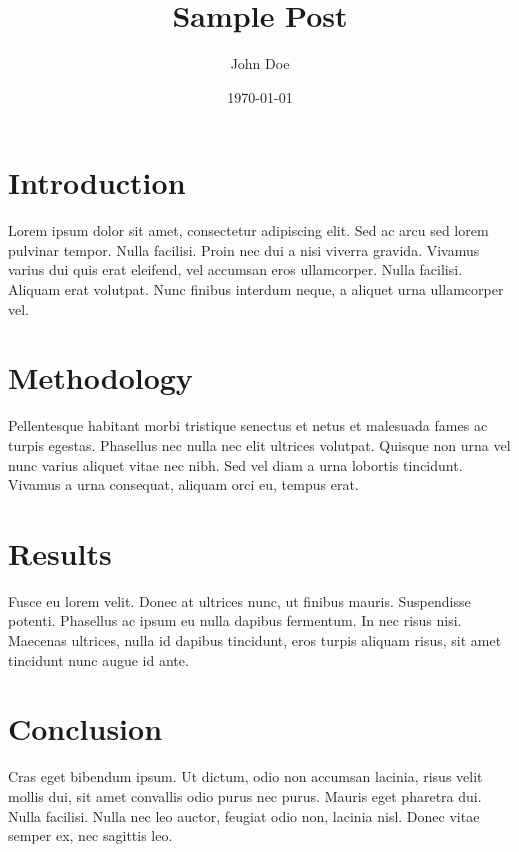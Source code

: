 \documentclass{article}
\title{Sample Post}
\author{John Doe}
\date{\today}
\begin{document}
\maketitle

\section{Introduction}
Lorem ipsum dolor sit amet, consectetur adipiscing elit. Sed ac arcu sed lorem pulvinar tempor. Nulla facilisi. Proin nec dui a nisi viverra gravida. Vivamus varius dui quis erat eleifend, vel accumsan eros ullamcorper. Nulla facilisi. Aliquam erat volutpat. Nunc finibus interdum neque, a aliquet urna ullamcorper vel.

\section{Methodology}
Pellentesque habitant morbi tristique senectus et netus et malesuada fames ac turpis egestas. Phasellus nec nulla nec elit ultrices volutpat. Quisque non urna vel nunc varius aliquet vitae nec nibh. Sed vel diam a urna lobortis tincidunt. Vivamus a urna consequat, aliquam orci eu, tempus erat.

\section{Results}
Fusce eu lorem velit. Donec at ultrices nunc, ut finibus mauris. Suspendisse potenti. Phasellus ac ipsum eu nulla dapibus fermentum. In nec risus nisi. Maecenas ultrices, nulla id dapibus tincidunt, eros turpis aliquam risus, sit amet tincidunt nunc augue id ante.

\section{Conclusion}
Cras eget bibendum ipsum. Ut dictum, odio non accumsan lacinia, risus velit mollis dui, sit amet convallis odio purus nec purus. Mauris eget pharetra dui. Nulla facilisi. Nulla nec leo auctor, feugiat odio non, lacinia nisl. Donec vitae semper ex, nec sagittis leo.
\end{document}
